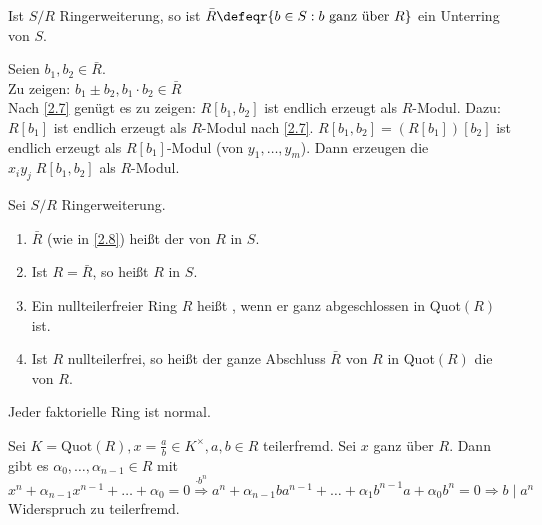\begin{Prop}
\label{2.8}
  Ist $S/R$ Ringerweiterung, so ist $\bar{R} \defeqr \{ b \in S: b \mbox{ ganz 
  über } R \}$ ein Unterring von $S$.
\end{Prop}

\begin{Bew} 
  Seien $b_1, b_2 \in \bar{R}$.\\
  Zu zeigen: $b_1 \pm b_2, b_1 \cdot b_2 \in \bar{R}$\\
  Nach \ref{2.7} genügt es zu zeigen: $R[b_1, b_2]$ ist endlich erzeugt als
  $R$-Modul.
  Dazu: $R[b_1]$ ist endlich erzeugt als $R$-Modul nach \ref{2.7}.
  $R[b_1, b_2] = (R[b_1])[b_2]$ ist endlich erzeugt als $R[b_1]$-Modul (von
  $y_1, \dots, y_m$).
  Dann erzeugen die $x_i y_j \; R[b_1, b_2]$ als $R$-Modul.
\end{Bew}

\begin{Def} 
  Sei $S/R$ Ringerweiterung.
  \begin{enumerate} 
    \item $\bar{R}$ (wie in \ref{2.8}) heißt der  von $R$ in $S$.
    \item Ist $R = \bar{R}$, so heißt $R$  in $S$.
    \item Ein nullteilerfreier Ring $R$ heißt , wenn er ganz
          abgeschlossen in Quot$(R)$ ist.
    \item Ist $R$ nullteilerfrei, so heißt der ganze Abschluss $\bar{R}$ von $R$
          in Quot$(R)$ die  von $R$.
  \end{enumerate}
\end{Def}

\begin{Bem}
\label{2.10}
  Jeder faktorielle Ring ist normal.
\end{Bem}

\begin{Bew} 
  Sei $K=\mbox{Quot}(R), x= \frac{a}{b} \in K^\times, a,b \in R$ teilerfremd.
  Sei $x$ ganz über $R$. Dann gibt es $\alpha_0, \dots, \alpha_{n-1} \in R$ mit
  $x^n + \alpha_{n-1} x^{n-1} + \dots + \alpha_0 = 0 \overset{\cdot b^n}{\Rightarrow}
  a^n + \alpha_{n-1} b a^{n-1} + \dots + \alpha_1 b^{n-1} a + \alpha_0 b^n = 0
  \Rightarrow b \mid a^n$ Widerspruch zu teilerfremd.
\end{Bew}

